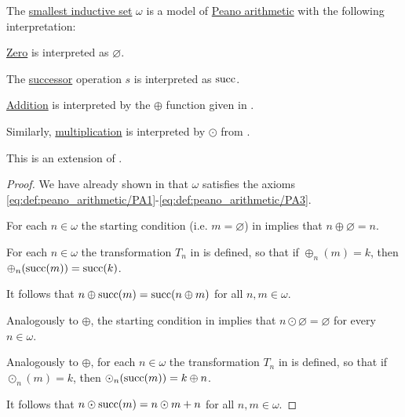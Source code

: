\begin{theorem}\label{thm:omega_is_model_of_pa}
  The \hyperref[thm:smallest_inductive_set_existence]{smallest inductive set} \( \omega \) is a model of \hyperref[def:peano_arithmetic]{Peano arithmetic} with the following interpretation:
  \begin{thmenum}
     \hyperref[def:peano_arithmetic/zero]{Zero} is interpreted as \( \varnothing \).

     The \hyperref[def:peano_arithmetic/succ]{successor} operation \( s \) is interpreted as \( \operatorname{succ} \).

     \hyperref[def:peano_arithmetic/plus]{Addition} is interpreted by the \( \oplus \) function given in .

     Similarly, \hyperref[def:peano_arithmetic/mult]{multiplication} is interpreted by \( \odot \) from .
  \end{thmenum}

  This is an extension of .
\end{theorem}
\begin{proof}
  We have already shown in  that \( \omega \) satisfies the axioms \eqref{eq:def:peano_arithmetic/PA1}-\eqref{eq:def:peano_arithmetic/PA3}.

   For each \( n \in \omega \) the starting condition (i.e. \( m = \varnothing \)) in  implies that \( n \oplus \varnothing = n \).

   For each \( n \in \omega \) the transformation \( T_n \) in  is defined, so that if \( \oplus_n(m) = k \), then \( \oplus_n(\operatorname{succ}(m)) = \operatorname{succ}(k) \).

  It follows that \( n \oplus \operatorname{succ}(m) = \operatorname{succ}(n \oplus m) \) for all \( n, m \in \omega \).

   Analogously to \( \oplus \), the starting condition in  implies that \( n \odot \varnothing = \varnothing \) for every \( n \in \omega \).

   Analogously to \( \oplus \), for each \( n \in \omega \) the transformation \( T_n \) in  is defined, so that if \( \odot_n(m) = k \), then \( \odot_n(\operatorname{succ}(m)) = k \oplus n \).

  It follows that \( n \odot \operatorname{succ}(m) = n \odot m + n \) for all \( n, m \in \omega \).
\end{proof}

